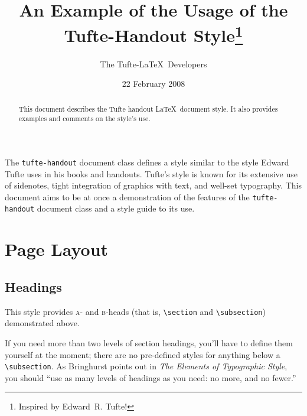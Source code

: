 \documentclass[nofonts]{tufte-handout}
\title{An Example of the Usage of the Tufte-Handout Style\thanks{Inspired by Edward~R. Tufte!}}
\author[The Tufte-LaTeX Developers]{The Tufte-\LaTeX\ Developers}
\date{22 February 2008}  %
\begin{document}
\maketitle %



\begin{abstract}
\noindent This document describes the Tufte handout \LaTeX\ document style.
It also provides examples and comments on the style's use.
\end{abstract}


The \Verb|tufte-handout| document class defines a style similar to the
style Edward Tufte uses in his books and handouts.  Tufte's style is known
for its extensive use of sidenotes, tight integration of graphics with
text, and well-set typography.  This document aims to be at once a
demonstration of the features of the \Verb|tufte-handout| document class
and a style guide to its use.

\section{Page Layout}\label{sec:page-layout}
\subsection{Headings}\label{sec:headings}
This style provides \textsc{a}- and \textsc{b}-heads (that is,
\Verb|\section| and \Verb|\subsection|) demonstrated above.

If you need more than two levels of section headings, you'll have to define
them yourself at the moment; there are no pre-defined styles for anything below a
\Verb|\subsection|.  As Bringhurst points out in \textit{The Elements of
Typographic Style},\cite{Bringhurst2005} you should ``use as many levels of
headings as you need: no more, and no fewer.''
\end{document}
